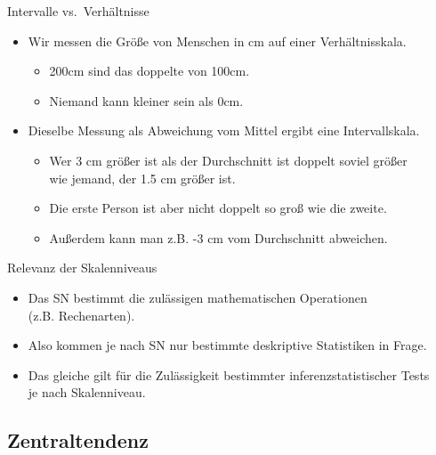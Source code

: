 \begin{frame}
  {Intervalle vs.\ Verhältnisse}
  \begin{itemize}[<+->]
    \item Wir messen die Größe von Menschen in cm auf einer Verhältnisskala.
      \begin{itemize}[<+->]
	\item 200cm sind das doppelte von 100cm.
	\item Niemand kann kleiner sein als 0cm. 
      \end{itemize}
      \vspace{0.5cm}
    \item Dieselbe Messung als \alert{Abweichung vom Mittel} ergibt eine Intervallskala.
      \begin{itemize}[<+->]
	\item Wer 3 cm größer ist als der Durchschnitt ist doppelt soviel größer\\
	  wie jemand, der 1.5 cm größer ist.
	\item Die erste Person ist aber nicht doppelt so groß wie die zweite.
	\item Außerdem kann man z.B. -3 cm vom Durchschnitt abweichen.
      \end{itemize}
  \end{itemize}
\end{frame}

\begin{frame}
  {Relevanz der Skalenniveaus}
  \begin{itemize}[<+->]
    \item Das SN bestimmt die \alert{zulässigen mathematischen Operationen}\\
      (z.B. Rechenarten).
    \item Also kommen je nach SN nur bestimmte \alert{deskriptive Statistiken} in Frage.
    \item Das gleiche gilt für die Zulässigkeit bestimmter \alert{inferenzstatistischer Tests}\\
      je nach Skalenniveau.
  \end{itemize}
\end{frame}


\subsection{Zentraltendenz}

